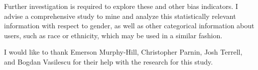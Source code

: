 \documentclass{sigplanconf}
\begin{document}
Further investigation is required to explore these and other bias indicators. I
advise a comprehensive study to mine and analyze this statistically relevant
information with respect to gender, as well as other categorical information
about users, such as race or ethnicity, which may be used in a similar fashion.


\acks
I would like to thank Emerson Murphy-Hill, Christopher Parnin, Josh Terrell, and
Bogdan Vasilescu for their help with the research for this study.






\end{document}
